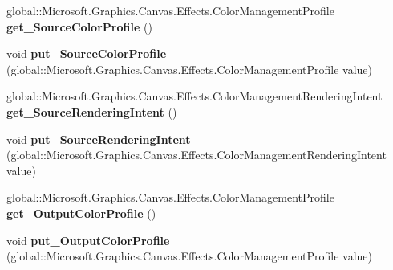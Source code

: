\begin{DoxyCompactItemize}
global\+::\+Microsoft.\+Graphics.\+Canvas.\+Effects.\+Color\+Management\+Profile {\bfseries get\+\_\+\+Source\+Color\+Profile} ()
\item 
\mbox{\label{class_microsoft_1_1_graphics_1_1_canvas_1_1_effects_1_1_color_management_effect_a5810de208f1afdb9ab4f2e1b99d5216f}} 
void {\bfseries put\+\_\+\+Source\+Color\+Profile} (global\+::\+Microsoft.\+Graphics.\+Canvas.\+Effects.\+Color\+Management\+Profile value)
\item 
\mbox{\label{class_microsoft_1_1_graphics_1_1_canvas_1_1_effects_1_1_color_management_effect_a3e5a8a23a3a6aa5fd2f094f13e898a44}} 
global\+::\+Microsoft.\+Graphics.\+Canvas.\+Effects.\+Color\+Management\+Rendering\+Intent {\bfseries get\+\_\+\+Source\+Rendering\+Intent} ()
\item 
\mbox{\label{class_microsoft_1_1_graphics_1_1_canvas_1_1_effects_1_1_color_management_effect_ae01d8260768b483504a24daed27da2b8}} 
void {\bfseries put\+\_\+\+Source\+Rendering\+Intent} (global\+::\+Microsoft.\+Graphics.\+Canvas.\+Effects.\+Color\+Management\+Rendering\+Intent value)
\item 
\mbox{\label{class_microsoft_1_1_graphics_1_1_canvas_1_1_effects_1_1_color_management_effect_a74ae08e1f5d954e1f9d89ddd5af9653d}} 
global\+::\+Microsoft.\+Graphics.\+Canvas.\+Effects.\+Color\+Management\+Profile {\bfseries get\+\_\+\+Output\+Color\+Profile} ()
\item 
\mbox{\label{class_microsoft_1_1_graphics_1_1_canvas_1_1_effects_1_1_color_management_effect_a8cc3db4456f5009c8bb5932d1ba34690}} 
void {\bfseries put\+\_\+\+Output\+Color\+Profile} (global\+::\+Microsoft.\+Graphics.\+Canvas.\+Effects.\+Color\+Management\+Profile value)
\item 
\mbox{\label{class_microsoft_1_1_graphics_1_1_canvas_1_1_effects_1_1_color_management_effect_ab3f873d532a7ac2daad8c8891c039b7b}} 

\end{DoxyCompactItemize}
